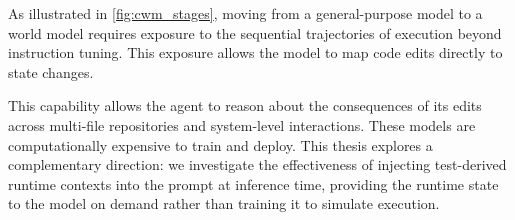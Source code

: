 As illustrated in \cref{fig:cwm_stages}, moving from a general-purpose model to a world model requires exposure to the sequential trajectories of execution beyond instruction tuning. This exposure allows the model to map code edits directly to state changes.

This capability allows the agent to reason about the consequences of its edits across multi-file repositories and system-level interactions. These models are computationally expensive to train and deploy. This thesis explores a complementary direction: we investigate the effectiveness of injecting test-derived runtime contexts into the prompt at inference time, providing the runtime state to the model on demand rather than training it to simulate execution.
